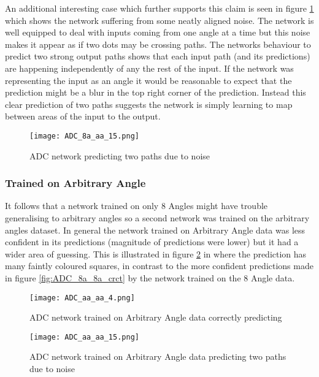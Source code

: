 An additional interesting case which further supports this claim is seen in figure \ref{fig:ADC_8aNoaa_special} which shows the network suffering from some neatly aligned noise. 
The network is well equipped to deal with inputs coming from one angle at a time but this noise makes it appear as if two dots may be crossing paths. 
The networks behaviour to predict two strong output paths shows that each input path (and its predictions) are happening independently of any the rest of the input.
If the network was representing the input as an angle it would be reasonable to expect that the prediction might be a blur in the top right corner of the prediction.  
Instead this clear prediction of two paths suggests the network is simply learning to map between areas of the input to the output. 

\begin{figure}
    \centering
    \texttt{[image: ADC\_8a\_aa\_15.png]}
    \caption{ADC network predicting two paths due to noise}
    \label{fig:ADC_8aNoaa_special}
\end{figure}


\subsubsection{Trained on Arbitrary Angle}
It follows that a network trained on only 8 Angles might have trouble generalising to arbitrary angles so a second network was trained on the arbitrary angles dataset. 
In general the network trained on Arbitrary Angle data was less confident in its predictions (magnitude of predictions were lower) but it had a wider area of guessing. 
This is illustrated in figure \ref{fig:ADC_aaaa_crct} in where the prediction has many faintly coloured squares, in contrast to the more confident predictions made in figure \ref{fig:ADC_8a_8a_crct} by the network trained on the 8 Angle data.

\begin{figure}[h]
    \centering
    \texttt{[image: ADC\_aa\_aa\_4.png]}
    \caption{ADC network trained on Arbitrary Angle data correctly predicting}
    \label{fig:ADC_aaaa_crct}
\end{figure}



\begin{figure}[h]
    \centering
    \texttt{[image: ADC\_aa\_aa\_15.png]}
    \caption{ADC network trained on Arbitrary Angle data predicting two paths due to noise}
    \label{fig:ADC_aaaa_twopath}
\end{figure}

